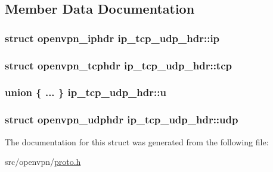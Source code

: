 \subsection{Member Data Documentation}
\hypertarget{structip__tcp__udp__hdr_a4e7c25d929a724fcb3b84d8909bf0e78}{}
\subsubsection[{ip}]{\setlength{\rightskip}{0pt plus 5cm}struct {\bf openvpn\+\_\+iphdr} ip\+\_\+tcp\+\_\+udp\+\_\+hdr\+::ip}\label{structip__tcp__udp__hdr_a4e7c25d929a724fcb3b84d8909bf0e78}
\hypertarget{structip__tcp__udp__hdr_aa0c123d19fa2f22a555941b8e6b374b5}{}
\subsubsection[{tcp}]{\setlength{\rightskip}{0pt plus 5cm}struct {\bf openvpn\+\_\+tcphdr} ip\+\_\+tcp\+\_\+udp\+\_\+hdr\+::tcp}\label{structip__tcp__udp__hdr_aa0c123d19fa2f22a555941b8e6b374b5}
\hypertarget{structip__tcp__udp__hdr_ab86163da5e98b649e1a36ca8fff24efe}{}
\subsubsection[{u}]{\setlength{\rightskip}{0pt plus 5cm}union \{ ... \}   ip\+\_\+tcp\+\_\+udp\+\_\+hdr\+::u}\label{structip__tcp__udp__hdr_ab86163da5e98b649e1a36ca8fff24efe}
\hypertarget{structip__tcp__udp__hdr_a77de3ae52d193d9083fdd809e25a82b8}{}
\subsubsection[{udp}]{\setlength{\rightskip}{0pt plus 5cm}struct {\bf openvpn\+\_\+udphdr} ip\+\_\+tcp\+\_\+udp\+\_\+hdr\+::udp}\label{structip__tcp__udp__hdr_a77de3ae52d193d9083fdd809e25a82b8}


The documentation for this struct was generated from the following file\+:\begin{DoxyCompactItemize}
\item 
src/openvpn/\hyperlink{proto_8h}{proto.\+h}\end{DoxyCompactItemize}
